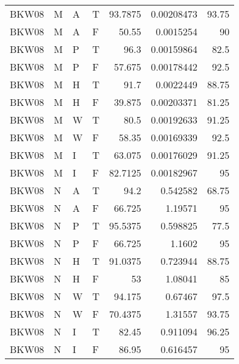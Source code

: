 \begin{tabular}{llllrrr}
    BKW08    & M     & A     & T          & 93.7875    & 0.00208473  & 93.75    \\
    BKW08    & M     & A     & F          & 50.55      & 0.0015254   & 90       \\
    BKW08    & M     & P     & T          & 96.3       & 0.00159864  & 82.5     \\
    BKW08    & M     & P     & F          & 57.675     & 0.00178442  & 92.5     \\
    BKW08    & M     & H     & T          & 91.7       & 0.0022449   & 88.75    \\
    BKW08    & M     & H     & F          & 39.875     & 0.00203371  & 81.25    \\
    BKW08    & M     & W     & T          & 80.5       & 0.00192633  & 91.25    \\
    BKW08    & M     & W     & F          & 58.35      & 0.00169339  & 92.5     \\
    BKW08    & M     & I     & T          & 63.075     & 0.00176029  & 91.25    \\
    BKW08    & M     & I     & F          & 82.7125    & 0.00182967  & 95       \\
    BKW08    & N     & A     & T          & 94.2       & 0.542582    & 68.75    \\
    BKW08    & N     & A     & F          & 66.725     & 1.19571     & 95       \\
    BKW08    & N     & P     & T          & 95.5375    & 0.598825    & 77.5     \\
    BKW08    & N     & P     & F          & 66.725     & 1.1602      & 95       \\
    BKW08    & N     & H     & T          & 91.0375    & 0.723944    & 88.75    \\
    BKW08    & N     & H     & F          & 53         & 1.08041     & 85       \\
    BKW08    & N     & W     & T          & 94.175     & 0.67467     & 97.5     \\
    BKW08    & N     & W     & F          & 70.4375    & 1.31557     & 93.75    \\
    BKW08    & N     & I     & T          & 82.45      & 0.911094    & 96.25    \\
    BKW08    & N     & I     & F          & 86.95      & 0.616457    & 95       \\
    \hline
\end{tabular}